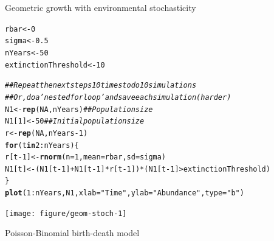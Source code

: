 \documentclass[12pt]{article}\usepackage[]{graphicx}\usepackage[]{xcolor}
\makeatletter
\newcommand{\hlnum}[1]{\textcolor[rgb]{0.686,0.059,0.569}{#1}}%
\newcommand{\hlsng}[1]{\textcolor[rgb]{0.192,0.494,0.8}{#1}}%
\newcommand{\hlcom}[1]{\textcolor[rgb]{0.678,0.584,0.686}{\textit{#1}}}%
\newcommand{\hlopt}[1]{\textcolor[rgb]{0,0,0}{#1}}%
\newcommand{\hldef}[1]{\textcolor[rgb]{0.345,0.345,0.345}{#1}}%
\newcommand{\hlkwa}[1]{\textcolor[rgb]{0.161,0.373,0.58}{\textbf{#1}}}%
\newcommand{\hlkwb}[1]{\textcolor[rgb]{0.69,0.353,0.396}{#1}}%
\newcommand{\hlkwc}[1]{\textcolor[rgb]{0.333,0.667,0.333}{#1}}%
\newcommand{\hlkwd}[1]{\textcolor[rgb]{0.737,0.353,0.396}{\textbf{#1}}}%
\newenvironment{kframe}{%
 \def\at@end@of@kframe{}%
 \ifinner\ifhmode%
  \def\at@end@of@kframe{\end{minipage}}%
  \begin{minipage}{\columnwidth}%
 \fi\fi%
 \def\FrameCommand##1{\hskip\@totalleftmargin \hskip-\fboxsep
 \colorbox{shadecolor}{##1}\hskip-\fboxsep
     \hskip-\linewidth \hskip-\@totalleftmargin \hskip\columnwidth}%
 \MakeFramed {\advance\hsize-\width
   \@totalleftmargin\z@ \linewidth\hsize
   \@setminipage}}%
 {\par\unskip\endMakeFramed%
 \at@end@of@kframe}
\newenvironment{knitrout}{}{} %
\makeatother
\begin{document}
Geometric growth with environmental stochasticity
\begin{knitrout}
\color{fgcolor}\begin{kframe}
\begin{alltt}
\hldef{rbar} \hlkwb{<-} \hlnum{0}
\hldef{sigma} \hlkwb{<-} \hlnum{0.5}
\hldef{nYears} \hlkwb{<-} \hlnum{50}
\hldef{extinctionThreshold} \hlkwb{<-} \hlnum{10}

\hlcom{## Repeat the next steps 10 times to do 10 simulations}
\hlcom{## Or, do a 'nested for loop' and save each simulation (harder)}
\hldef{N1} \hlkwb{<-} \hlkwd{rep}\hldef{(}\hlnum{NA}\hldef{, nYears)}  \hlcom{## Population size }
\hldef{N1[}\hlnum{1}\hldef{]} \hlkwb{<-} \hlnum{50}            \hlcom{## Initial population size}
\hldef{r} \hlkwb{<-} \hlkwd{rep}\hldef{(}\hlnum{NA}\hldef{, nYears}\hlopt{-}\hlnum{1}\hldef{)}
\hlkwa{for}\hldef{(t} \hlkwa{in} \hlnum{2}\hlopt{:}\hldef{nYears) \{}
    \hldef{r[t}\hlopt{-}\hlnum{1}\hldef{]} \hlkwb{<-} \hlkwd{rnorm}\hldef{(}\hlkwc{n}\hldef{=}\hlnum{1}\hldef{,} \hlkwc{mean}\hldef{=rbar,} \hlkwc{sd}\hldef{=sigma)}
    \hldef{N1[t]} \hlkwb{<-} \hldef{(N1[t}\hlopt{-}\hlnum{1}\hldef{]} \hlopt{+} \hldef{N1[t}\hlopt{-}\hlnum{1}\hldef{]}\hlopt{*}\hldef{r[t}\hlopt{-}\hlnum{1}\hldef{])}\hlopt{*}\hldef{(N1[t}\hlopt{-}\hlnum{1}\hldef{]}\hlopt{>}\hldef{extinctionThreshold)}
\hldef{\}}
\hlkwd{plot}\hldef{(}\hlnum{1}\hlopt{:}\hldef{nYears, N1,} \hlkwc{xlab}\hldef{=}\hlsng{"Time"}\hldef{,} \hlkwc{ylab}\hldef{=}\hlsng{"Abundance"}\hldef{,} \hlkwc{type}\hldef{=}\hlsng{"b"}\hldef{)}
\end{alltt}
\end{kframe}

{\centering \texttt{[image: figure/geom-stoch-1]} 

}


\end{knitrout}


\newpage

Poisson-Binomial birth-death model
\end{document}
